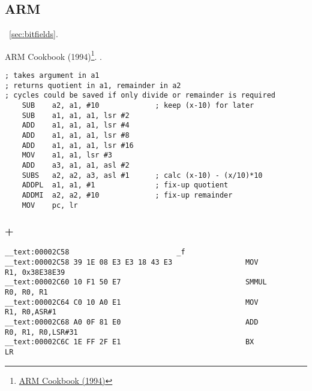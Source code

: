 

\subsection{ARM}

~\ref{sec:bitfields}.

ARM Cookbook (1994)\footnote{\href{http://yurichev.com/ref/ARM\%20Cookbook\%20(1994)/cook3.txt}{ARM Cookbook (1994)}}. 
.

\begin{lstlisting}
; takes argument in a1
; returns quotient in a1, remainder in a2
; cycles could be saved if only divide or remainder is required
    SUB    a2, a1, #10             ; keep (x-10) for later
    SUB    a1, a1, a1, lsr #2
    ADD    a1, a1, a1, lsr #4
    ADD    a1, a1, a1, lsr #8
    ADD    a1, a1, a1, lsr #16
    MOV    a1, a1, lsr #3
    ADD    a3, a1, a1, asl #2
    SUBS   a2, a2, a3, asl #1      ; calc (x-10) - (x/10)*10
    ADDPL  a1, a1, #1              ; fix-up quotient
    ADDMI  a2, a2, #10             ; fix-up remainder
    MOV    pc, lr
\end{lstlisting}

\subsubsection{\OptimizingXcode + \ARMMode}

\begin{lstlisting}
__text:00002C58                         _f
__text:00002C58 39 1E 08 E3 E3 18 43 E3                 MOV             R1, 0x38E38E39
__text:00002C60 10 F1 50 E7                             SMMUL           R0, R0, R1
__text:00002C64 C0 10 A0 E1                             MOV             R1, R0,ASR#1
__text:00002C68 A0 0F 81 E0                             ADD             R0, R1, R0,LSR#31
__text:00002C6C 1E FF 2F E1                             BX              LR
\end{lstlisting}


